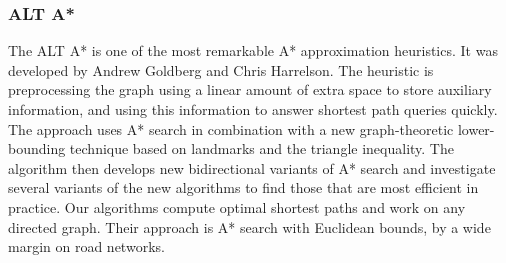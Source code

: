 \documentclass[12pt]{article}
\begin{document}
\subsubsection{ALT A*}
The ALT A* is one of the most remarkable A* approximation heuristics. It was developed by Andrew Goldberg and Chris Harrelson. The heuristic is preprocessing the graph using a linear amount of extra space to store auxiliary information, and using this information to answer shortest path queries quickly. The approach uses A* search in combination with a new graph-theoretic lower-bounding technique based on landmarks and the triangle inequality. The algorithm then develops new bidirectional variants of A* search and investigate several variants of the new algorithms to find those that are most efficient in practice. Our algorithms compute optimal shortest paths and work on any directed graph. Their approach is A* search with Euclidean bounds, by a wide margin on road networks.



\poi
\printbibliography

\end{document}
